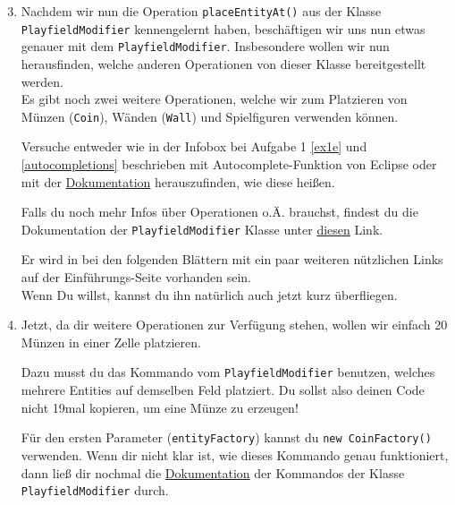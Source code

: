 \begin{enumerate}
	\setcounter{enumi}{2}
    \item Nachdem wir nun die Operation \lstinline{placeEntityAt()} aus der Klasse \lstinline{PlayfieldModifier} kennengelernt haben, beschäftigen wir uns nun etwas genauer mit dem \lstinline{PlayfieldModifier}.
    Insbesondere wollen wir nun herausfinden, welche anderen Operationen von dieser Klasse bereitgestellt werden.\\
    Es gibt noch zwei weitere Operationen, welche wir zum Platzieren von Münzen (\lstinline{Coin}), Wänden (\lstinline{Wall}) und Spielfiguren verwenden können.

    Versuche entweder wie in der Infobox bei Aufgabe 1 \ref{ex1e} und \ref{autocompletions} beschrieben mit Autocomplete-Funktion von Eclipse oder mit der \href{\javadocRoot}{Dokumentation} herauszufinden, wie diese heißen.

    Falls du noch mehr Infos über Operationen o.Ä. brauchst, findest du die Dokumentation der \newline \lstinline{PlayfieldModifier} Klasse unter \href{\javadocRoot de.unistuttgart.informatik.fius.icge.simulation/de/unistuttgart/informatik/fius/icge/simulation/tools/PlayfieldModifier.html}{diesen} Link.

    Er wird in bei den folgenden Blättern mit ein paar weiteren nützlichen Links auf der Einführungs-Seite vorhanden sein.\\
	Wenn Du willst, kannst du ihn natürlich auch jetzt kurz überfliegen.

    \item Jetzt, da dir weitere Operationen zur Verfügung stehen, wollen wir einfach 20 Münzen in einer Zelle platzieren.

    Dazu musst du das Kommando vom \lstinline{PlayfieldModifier} benutzen, welches mehrere Entities auf demselben Feld platziert. Du sollst also deinen Code nicht 19mal kopieren, um eine Münze zu erzeugen!

    Für den ersten Parameter (\lstinline{entityFactory}) kannst du \lstinline{new CoinFactory()} verwenden.
    Wenn dir nicht klar ist, wie dieses Kommando genau funktioniert, dann ließ dir nochmal die \href{\javadocRoot de.unistuttgart.informatik.fius.icge.simulation/de/unistuttgart/informatik/fius/icge/simulation/tools/PlayfieldModifier.html}{Dokumentation} der Kommandos der Klasse \lstinline{PlayfieldModifier} durch.
\end{enumerate}

